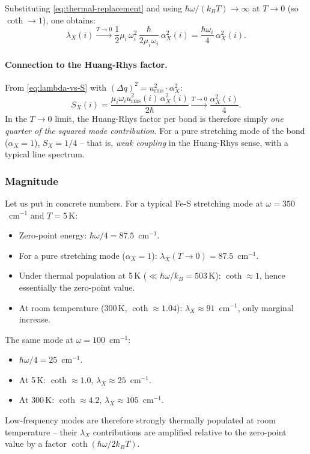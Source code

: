 \documentclass[11pt,a4paper,twoside]{article}
\theoremstyle{remark}
\begin{document}
Substituting \eqref{eq:thermal-replacement} and using
$\hbar\omega/(k_BT) \to \infty$ at $T \to 0$ (so $\coth \to 1$),
one obtains:
\begin{equation}
  \lambda_X(i) \xrightarrow{T \to 0}
  \frac{1}{2}\mu_i\,\omega_i^2\,\frac{\hbar}{2\mu_i\omega_i}\,\alpha_X^2(i)
  = \frac{\hbar\omega_i}{4}\,\alpha_X^2(i).
  \label{eq:lambda-zero-T}
\end{equation}

\paragraph{Connection to the Huang-Rhys factor.}
From \eqref{eq:lambda-vs-S} with
$(\Delta q)^2 = u_\text{rms}^2 \cdot \alpha_X^2$:
\begin{equation}
  S_X(i) = \frac{\mu_i\omega_i u_\text{rms}^2(i)\,\alpha_X^2(i)}{2\hbar}
  \xrightarrow{T \to 0} \frac{\alpha_X^2(i)}{4}.
\end{equation}
In the $T \to 0$ limit, the Huang-Rhys factor per bond is therefore
simply \emph{one quarter of the squared mode contribution}. For a
pure stretching mode of the bond ($\alpha_X = 1$), $S_X = 1/4$ --
that is, \emph{weak coupling} in the Huang-Rhys sense, with a
typical line spectrum.

\subsubsection*{Magnitude}

Let us put in concrete numbers. For a typical Fe-S stretching
mode at $\omega = 350$~cm$^{-1}$ and $T = 5$\,K:
\begin{itemize}\setlength{\itemsep}{0pt}
  \item Zero-point energy: $\hbar\omega/4 = 87.5$~cm$^{-1}$.
  \item For a pure stretching mode ($\alpha_X = 1$):
        $\lambda_X(T \to 0) = 87.5$~cm$^{-1}$.
  \item Under thermal population at 5\,K
        ($\ll \hbar\omega/k_B = 503$\,K): $\coth \approx 1$, hence
        essentially the zero-point value.
  \item At room temperature (300\,K, $\coth \approx 1.04$):
        $\lambda_X \approx 91$~cm$^{-1}$, only marginal increase.
\end{itemize}

The same mode at $\omega = 100$~cm$^{-1}$:
\begin{itemize}\setlength{\itemsep}{0pt}
  \item $\hbar\omega/4 = 25$~cm$^{-1}$.
  \item At 5\,K: $\coth \approx 1.0$, $\lambda_X \approx 25$~cm$^{-1}$.
  \item At 300\,K: $\coth \approx 4.2$, $\lambda_X \approx 105$~cm$^{-1}$.
\end{itemize}
Low-frequency modes are therefore strongly thermally populated at
room temperature -- their $\lambda_X$ contributions are amplified
relative to the zero-point value by a factor
$\coth(\hbar\omega/2k_BT)$.
\end{document}
